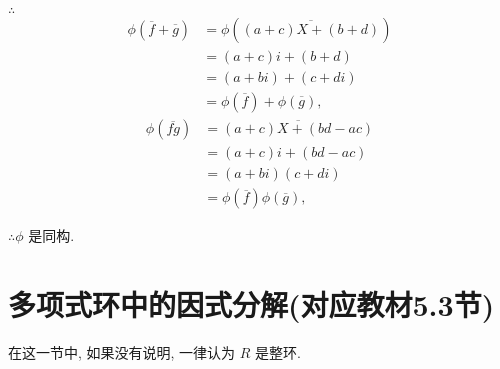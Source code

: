 \documentclass[UTF8]{ctexart}
\begin{document}
\begin{example}
    $\therefore$
    \begin{align*}
        \phi(\overline{f}+\overline{g}) & =\phi(\overline{(a+c)X+(b+d)}) \\
        & =(a+c)i+(b+d) \\
        & =(a+bi)+(c+di) \\
        & =\phi(\overline{f})+\phi(\overline{g}),
    \end{align*}
    \begin{align*}
        \phi(\overline{fg}) & =\overline{(a+c)X+(bd-ac)} \\
        & =(a+c)i+(bd-ac) \\
        & =(a+bi)(c+di) \\
        & =\phi(\overline{f})\phi(\overline{g}),
    \end{align*}

    $\therefore\phi$ 是同构.
\end{example}
\section{多项式环中的因式分解(对应教材5.3节)}
在这一节中, 如果没有说明, 一律认为 $R$ 是整环.
\end{document}
